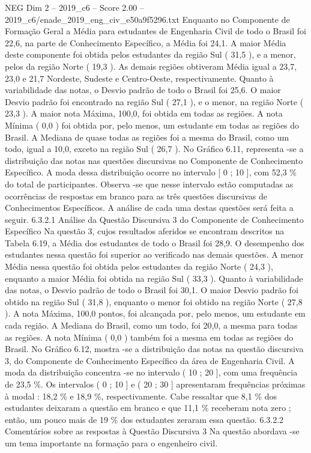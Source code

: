\begin{textsample}{NEG Dim 2 – 2019\_c6 – Score 2.00 – 2019\_c6/enade\_2019\_eng\_civ\_e50a9f5296.txt}
Enquanto no Componente de Formação Geral a Média para estudantes de Engenharia Civil de todo o Brasil foi 22,6, na parte de Conhecimento Específico, a Média foi 24,1.
A maior Média deste componente foi obtida pelos estudantes da região Sul ( 31,5 ), e a menor, pelos da região Norte ( 19,3 ).
As demais regiões obtiveram Média igual a 23,7, 23,0 e 21,7 Nordeste, Sudeste e Centro-Oeste, respectivamente.
Quanto à variabilidade das notas, o Desvio padrão de todo o Brasil foi 25,6.
O maior Desvio padrão foi encontrado na região Sul ( 27,1 ), e o menor, na região Norte ( 23,3 ).
A maior nota Máxima, 100,0, foi obtida em todas as regiões.
A nota Mínima ( 0,0 ) foi obtida por, pelo menos, um estudante em todas as regiões do Brasil.
A Mediana de quase todas as regiões foi a mesma do Brasil, como um todo, igual a 10,0, exceto na região Sul ( 26,7 ).
No Gráfico 6.11, representa -se a distribuição das notas nas questões discursivas no Componente de Conhecimento Específico.
A moda dessa distribuição ocorre no intervalo [ 0 ; 10 ], com 52,3 \% do total de participantes.
Observa -se que nesse intervalo estão computadas as ocorrências de respostas em branco para as três questões discursivas de Conhecimentos Específicos.
A análise de cada uma destas questões será feita a seguir. 6.3.2.1 Análise da Questão Discursiva 3 do Componente de Conhecimento Específico Na questão 3, cujos resultados aferidos se encontram descritos na Tabela 6.19, a Média dos estudantes de todo o Brasil foi 28,9.
O desempenho dos estudantes nessa questão foi superior ao verificado nas demais questões.
A menor Média nessa questão foi obtida pelos estudantes da região Norte ( 24,3 ), enquanto a maior Média foi obtida na região Sul ( 33,3 ).
Quanto à variabilidade das notas, o Desvio padrão de todo o Brasil foi 30,1.
O maior Desvio padrão foi obtido na região Sul ( 31,8 ), enquanto o menor foi obtido na região Norte ( 27,8 ).
A nota Máxima, 100,0 pontos, foi alcançada por, pelo menos, um estudante em cada região.
A Mediana do Brasil, como um todo, foi 20,0, a mesma para todas as regiões.
A nota Mínima ( 0,0 ) também foi a mesma em todas as regiões do Brasil.
No Gráfico 6.12, mostra -se a distribuição das notas na questão discursiva 3, do Componente de Conhecimento Específico da área de Engenharia Civil.
A moda da distribuição concentra -se no intervalo ( 10 ; 20 ], com uma frequência de 23,5 \%.
Os intervalos ( 0 ; 10 ] e ( 20 ; 30 ] apresentaram frequências próximas à modal : 18,2 \% e 18,9 \%, respectivamente.
Cabe ressaltar que 8,1 \% dos estudantes deixaram a questão em branco e que 11,1 \% receberam nota zero ; então, um pouco mais de 19 \% dos estudantes zeraram essa questão. 6.3.2.2 Comentários sobre as respostas à Questão Discursiva 3 Na questão abordava -se um tema importante na formação para o engenheiro civil.

\end{textsample}

